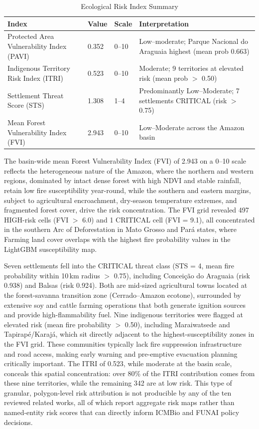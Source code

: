 \documentclass[12pt,a4paper]{article}
\begin{document}
\begin{table}[H]
\centering
\caption{Ecological Risk Index Summary}
\label{tab:risk}
\begin{tabularx}{\textwidth}{lllX}
\toprule
\textbf{Index} & \textbf{Value} & \textbf{Scale} & \textbf{Interpretation} \\
\midrule
Protected Area Vulnerability Index (PAVI) & 0.352 & 0--10 & Low--moderate; Parque Nacional do Araguaia highest (mean prob 0.663) \\
Indigenous Territory Risk Index (ITRI)    & 0.523 & 0--10 & Moderate; 9 territories at elevated risk (mean prob $>$ 0.50) \\
Settlement Threat Score (STS)             & 1.308 & 1--4  & Predominantly Low--Moderate; 7 settlements CRITICAL (risk $>$ 0.75) \\
Mean Forest Vulnerability Index (FVI)     & 2.943 & 0--10 & Low--Moderate across the Amazon basin \\
\bottomrule
\end{tabularx}
\end{table}

The basin-wide mean Forest Vulnerability Index (FVI) of 2.943 on a 0--10 scale reflects the heterogeneous nature of the Amazon, where the northern and western regions, dominated by intact dense forest with high NDVI and stable rainfall, retain low fire susceptibility year-round, while the southern and eastern margins, subject to agricultural encroachment, dry-season temperature extremes, and fragmented forest cover, drive the risk concentration. The FVI grid revealed 497 HIGH-risk cells (FVI $>$ 6.0) and 1 CRITICAL cell (FVI = 9.1), all concentrated in the southern Arc of Deforestation in Mato Grosso and Par\'{a} states, where Farming land cover overlaps with the highest fire probability values in the LightGBM susceptibility map.

Seven settlements fell into the CRITICAL threat class (STS = 4, mean fire probability within 10\,km radius $>$ 0.75), including Concei\c{c}\~{a}o do Araguaia (risk 0.938) and Balsas (risk 0.924). Both are mid-sized agricultural towns located at the forest-savanna transition zone (Cerrado--Amazon ecotone), surrounded by extensive soy and cattle farming operations that both generate ignition sources and provide high-flammability fuel. Nine indigenous territories were flagged at elevated risk (mean fire probability $>$ 0.50), including Maraiwatsede and Tapira\-p\'{e}/Karaj\'{a}, which sit directly adjacent to the highest-susceptibility zones in the FVI grid. These communities typically lack fire suppression infrastructure and road access, making early warning and pre-emptive evacuation planning critically important. The ITRI of 0.523, while moderate at the basin scale, conceals this spatial concentration: over 80\% of the ITRI contribution comes from these nine territories, while the remaining 342 are at low risk. This type of granular, polygon-level risk attribution is not producible by any of the ten reviewed related works, all of which report aggregate risk maps rather than named-entity risk scores that can directly inform ICMBio and FUNAI policy decisions.
\end{document}
